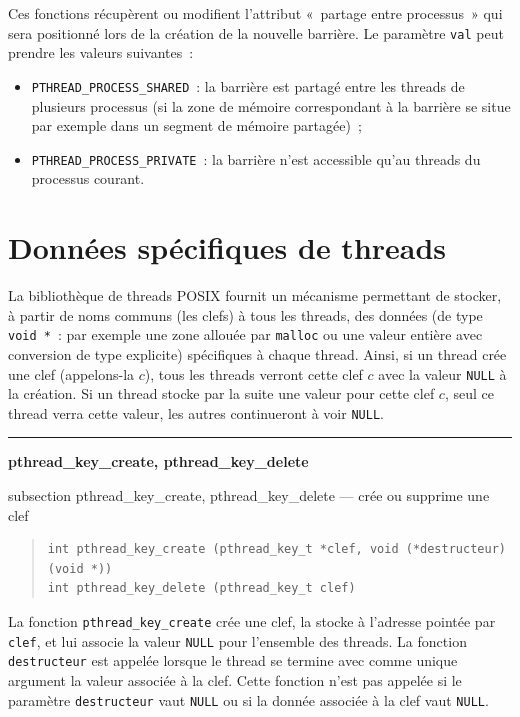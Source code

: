 \documentclass [twoside] {report}
\newcommand {\primitive} [1]
    {
	\phantomsection
	{\large \textbf {#1}}
	\addcontentsline {toc} {subsection} {#1}
    }
\newcommand {\separation}
    {
	\vspace {5mm}
	\nopagebreak
	\hrule
    }
\begin{document}
Ces fonctions récupèrent ou modifient l'attribut «~partage entre
processus~» qui sera positionné lors de la création de la nouvelle
barrière. Le paramètre \texttt {val} peut prendre les valeurs suivantes~:

\begin {itemize}
    \item \verb|PTHREAD_PROCESS_SHARED|~: la barrière
	est partagé entre les threads de plusieurs processus (si la zone
	de mémoire correspondant à la barrière se situe par exemple dans un
	segment de mémoire partagée)~;
    \item \verb|PTHREAD_PROCESS_PRIVATE|~: la barrière n'est accessible
	qu'au threads du processus courant.
\end {itemize}


\section {Données spécifiques de threads}

La bibliothèque de threads POSIX fournit un mécanisme permettant de
stocker, à partir de noms communs (les clefs) à tous les threads,
des données (de type \verb|void *|~: par exemple une zone allouée
par \texttt {malloc} ou une valeur entière avec conversion de type
explicite) spécifiques à chaque thread. Ainsi, si un thread crée une
clef (appelons-la $c$), tous les threads verront cette clef $c$ avec
la valeur \texttt {NULL} à la création.  Si un thread stocke par la
suite une valeur pour cette clef $c$, seul ce thread verra cette valeur,
les autres continueront à voir \texttt {NULL}.


\separation
\primitive {pthread\_key\_create, pthread\_key\_delete} --- crée ou supprime une clef

\begin {quote}
\begin {verbatim}
int pthread_key_create (pthread_key_t *clef, void (*destructeur) (void *))
int pthread_key_delete (pthread_key_t clef)
\end{verbatim}
\end {quote}

La fonction \verb|pthread_key_create| crée une clef, la stocke à
l'adresse pointée par \texttt {clef}, et lui associe la valeur \texttt
{NULL} pour l'ensemble des threads. La fonction \texttt {destructeur}
est appelée lorsque le thread se termine avec comme unique argument la
valeur associée à la clef. Cette fonction n'est pas appelée si le
paramètre \texttt {destructeur} vaut \texttt {NULL} ou si la donnée
associée à la clef vaut \texttt {NULL}.
\end{document}
